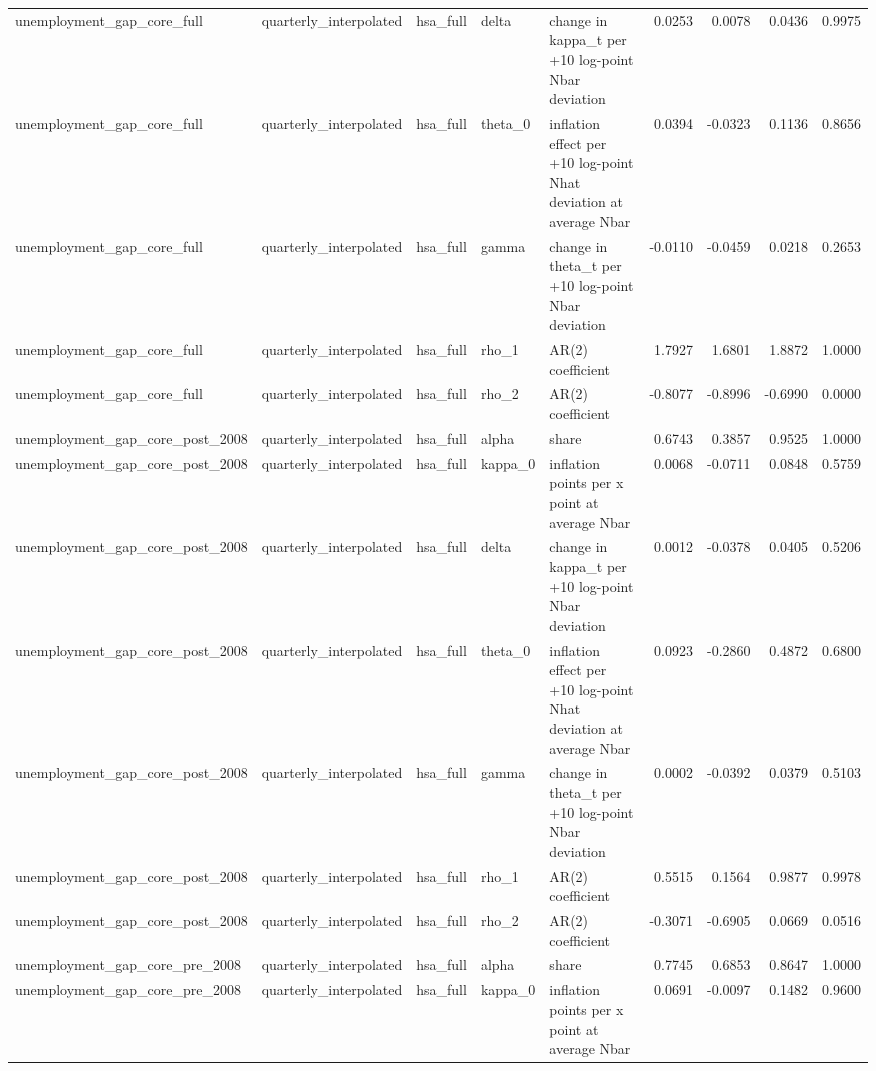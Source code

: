 \begin{tabular}{lllllrrrr}
unemployment\_gap\_core\_full & quarterly\_interpolated & hsa\_full & delta & change in kappa\_t per +10 log-point Nbar deviation & 0.0253 & 0.0078 & 0.0436 & 0.9975 \\
unemployment\_gap\_core\_full & quarterly\_interpolated & hsa\_full & theta\_0 & inflation effect per +10 log-point Nhat deviation at average Nbar & 0.0394 & -0.0323 & 0.1136 & 0.8656 \\
unemployment\_gap\_core\_full & quarterly\_interpolated & hsa\_full & gamma & change in theta\_t per +10 log-point Nbar deviation & -0.0110 & -0.0459 & 0.0218 & 0.2653 \\
unemployment\_gap\_core\_full & quarterly\_interpolated & hsa\_full & rho\_1 & AR(2) coefficient & 1.7927 & 1.6801 & 1.8872 & 1.0000 \\
unemployment\_gap\_core\_full & quarterly\_interpolated & hsa\_full & rho\_2 & AR(2) coefficient & -0.8077 & -0.8996 & -0.6990 & 0.0000 \\
unemployment\_gap\_core\_post\_2008 & quarterly\_interpolated & hsa\_full & alpha & share & 0.6743 & 0.3857 & 0.9525 & 1.0000 \\
unemployment\_gap\_core\_post\_2008 & quarterly\_interpolated & hsa\_full & kappa\_0 & inflation points per x point at average Nbar & 0.0068 & -0.0711 & 0.0848 & 0.5759 \\
unemployment\_gap\_core\_post\_2008 & quarterly\_interpolated & hsa\_full & delta & change in kappa\_t per +10 log-point Nbar deviation & 0.0012 & -0.0378 & 0.0405 & 0.5206 \\
unemployment\_gap\_core\_post\_2008 & quarterly\_interpolated & hsa\_full & theta\_0 & inflation effect per +10 log-point Nhat deviation at average Nbar & 0.0923 & -0.2860 & 0.4872 & 0.6800 \\
unemployment\_gap\_core\_post\_2008 & quarterly\_interpolated & hsa\_full & gamma & change in theta\_t per +10 log-point Nbar deviation & 0.0002 & -0.0392 & 0.0379 & 0.5103 \\
unemployment\_gap\_core\_post\_2008 & quarterly\_interpolated & hsa\_full & rho\_1 & AR(2) coefficient & 0.5515 & 0.1564 & 0.9877 & 0.9978 \\
unemployment\_gap\_core\_post\_2008 & quarterly\_interpolated & hsa\_full & rho\_2 & AR(2) coefficient & -0.3071 & -0.6905 & 0.0669 & 0.0516 \\
unemployment\_gap\_core\_pre\_2008 & quarterly\_interpolated & hsa\_full & alpha & share & 0.7745 & 0.6853 & 0.8647 & 1.0000 \\
unemployment\_gap\_core\_pre\_2008 & quarterly\_interpolated & hsa\_full & kappa\_0 & inflation points per x point at average Nbar & 0.0691 & -0.0097 & 0.1482 & 0.9600 \\

\end{tabular}
